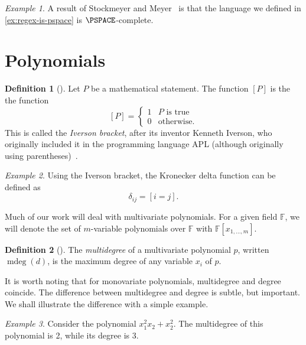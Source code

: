 \documentclass[english]{reedthesis}
\theoremstyle{plain}
\theoremstyle{definition}
\newtheorem{defn}[defn]{Definition}
\theoremstyle{remark}
\newtheorem{example}{Example}[thm]
\DeclareMathOperator{\mdeg}{mdeg}
\begin{document}
\begin{example}
  A result of Stockmeyer and Meyer~\cite{SM73} is that the language we defined
  in \cref{ex:regex-is-pspace} is $\PSPACE$-complete.
\end{example}

\section{Polynomials}\label{sec:polynomial}

\begin{defn}[{\cite{Knu92}}]\label{def:iverson-bracket}
  Let $P$ be a mathematical statement. The function $[P]$ is the the function
  \begin{equation}\label{eqn:iverson-bracket}
    [P] = \begin{cases}
      1 & P \text{ is true} \\
      0 & \text{otherwise.}
    \end{cases}
  \end{equation}
  This is called the \emph{Iverson bracket}, after its inventor Kenneth Iverson,
  who originally included it in the programming language APL (although
  originally using parentheses)~\cite[11]{APL}.
\end{defn}

\begin{example}
  Using the Iverson bracket, the Kronecker delta function can be defined as
  \[
    \delta_{ij} = [i = j].
  \]
\end{example}

Much of our work will deal with multivariate polynomials. For a given field
$\mathbb{F}$, we will denote the set of $m$-variable polynomials over
$\mathbb{F}$ with $\mathbb{F}[x_{1, \ldots, m}]$.

\begin{defn}[{\cite[8]{AW09}}]\label{def:mdeg}
  The \emph{multidegree} of a multivariate polynomial $p$, written $\mdeg(d)$,
  is the maximum degree of any variable $x_{i}$ of $p$.
\end{defn}

It is worth noting that for monovariate polynomials, multidegree and degree
coincide. The difference between multidegree and degree is subtle, but
important. We shall illustrate the difference with a simple example.

\begin{example}
  Consider the polynomial $x_{1}^{2}x_{2} + x_{2}^{2}$. The multidegree of this
  polynomial is 2, while its degree is 3.
\end{example}
\end{document}
